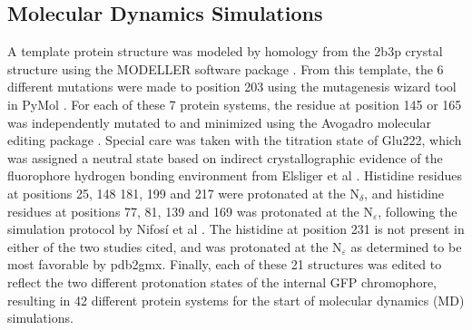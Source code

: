 \subsection{Molecular Dynamics Simulations}

A template protein structure was modeled by homology from the 2b3p crystal structure\cite{Pedelacq2006} using the MODELLER software package \cite{Marti-Renom2000}.
From this template, the 6 different mutations were made to position 203 using the mutagenesis wizard tool in PyMol \cite{DeLano2002}.
For each of these 7 protein systems, the residue at position 145 or 165 was independently mutated to \pCNF{} and minimized using the Avogadro molecular editing package \cite{Hanwell2012}. 
Special care was taken with the titration state of Glu222, which was assigned a neutral state based on indirect crystallographic evidence of the fluorophore hydrogen bonding environment from Elsliger et al \cite{Elsliger1999}. 
Histidine residues at positions 25, 148 181, 199 and 217 were protonated at the N$_{\delta}$, and histidine residues at positions 77, 81, 139 and 169 was protonated at the N$_{\varepsilon}$, following the simulation protocol by Nifos\'i et al \cite{Nifosi2003}.
The histidine at position 231 is not present in either of the two studies cited, and was protonated at the N$_{\varepsilon}$ as determined to be most favorable by pdb2gmx. 
Finally, each of these 21 structures was edited to reflect the two different protonation states of the internal GFP chromophore, resulting in 42 different protein systems for the start of molecular dynamics (MD) simulations. 

